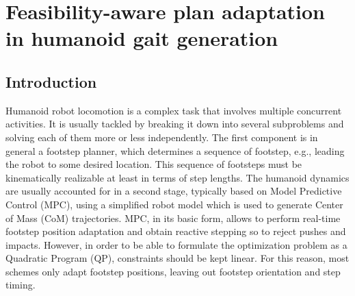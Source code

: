 \chapter{Feasibility-aware plan adaptation in humanoid gait generation}


\section{Introduction} 
\label{sec:FAPA:Introduction}

Humanoid robot locomotion is a complex task that involves multiple concurrent activities. It is usually tackled by breaking it down into several subproblems and solving each of them more or less independently. The first component is in general a footstep planner, which determines a sequence of footstep, e.g., leading the robot to some desired location. This sequence of footsteps must be kinematically realizable at least in terms of step lengths. The humanoid dynamics are usually accounted for in a second stage, typically based on Model Predictive Control (MPC), using a simplified robot model which is used to generate Center of Mass (CoM) trajectories. MPC, in its basic form, allows to perform real-time footstep position adaptation \cite{HePeWi:10} and obtain reactive stepping so to  reject pushes and impacts. However, in order to be able to formulate the optimization problem as a Quadratic Program (QP), constraints should be kept linear. For this reason, most schemes only adapt footstep positions, leaving out footstep orientation and step timing.


